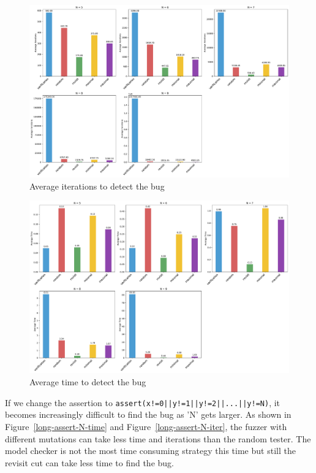 \begin{figure}[h!tbp]
	\centering
	\includegraphics[scale=0.3]{figure/long-assert/fuzz_assert5_iter.pdf}
	\caption{Average iterations to detect the bug}
	\label{long-assert-N5-iter}
\end{figure}


\begin{figure}[h!tbp]
	\centering
	\includegraphics[scale=0.3]{figure/long-assert/fuzz_assert5_time.pdf}
	\caption{Average time to detect the bug}
	\label{long-assert-N5-time}
\end{figure}

If we change the assertion to \texttt{assert(x!=0||y!=1||y!=2||...||y!=N)}, it becomes increasingly difficult to find the bug as 'N' gets larger. As shown in Figure~\ref{long-assert-N-time} and Figure~\ref{long-assert-N-iter}, the fuzzer with different mutations can take less time and iterations than the random tester. The model checker is not the most time consuming strategy this time but still the revisit cut can take less time to find the bug.


